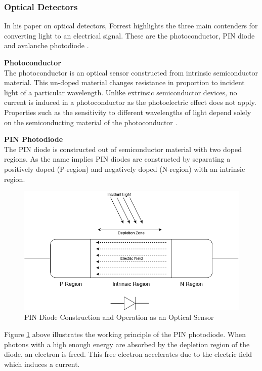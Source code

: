 \subsubsection{Optical Detectors}
In his paper on optical detectors, Forrest highlights the three main contenders for converting light to an electrical signal. These are the photoconductor, PIN diode and avalanche photodiode \cite{Forrest1986}.

\textbf{Photoconductor}\\
The photoconductor is an optical sensor constructed from intrinsic semiconductor material. This un-doped material changes resistance in proportion to incident light of a particular wavelength. Unlike extrinsic semiconductor devices, no current is induced in a photoconductor as the photoelectric effect does not apply. Properties such as the sensitivity to different wavelengths of light depend solely on the semiconducting material of the photoconductor \cite{Kingston2003}.

\textbf{PIN Photodiode}\\
The PIN diode is constructed out of semiconductor material with two doped regions. As the name implies PIN diodes are constructed by separating a positively doped (P-region) and negatively doped (N-region) with an intrinsic region.

\begin{figure}[H]
	\centering
	\includegraphics[width=0.8\linewidth]{figures/litreview/pin_diode_diagram.png}
	\caption{PIN Diode Construction and Operation as an Optical Sensor}
	\label{fig:pin_diode_diagram}
\end{figure}

Figure \ref{fig:pin_diode_diagram} above illustrates the working principle of the PIN photodiode.
When photons with a high enough energy are absorbed by the depletion region of the diode, an electron is freed. This free electron accelerates due to the electric field which induces a current.

